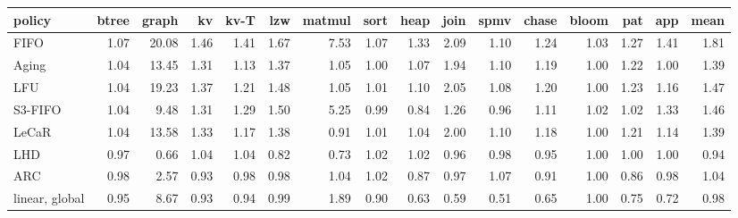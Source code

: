 \begin{tabular}{lrrrrrrrrrrrrrrr}
\toprule
policy & btree & graph & kv & kv-T & lzw & matmul & sort & heap & join & spmv & chase & bloom & pat & app & mean \\
\midrule
FIFO & 1.07 & 20.08 & 1.46 & 1.41 & 1.67 & 7.53 & 1.07 & 1.33 & 2.09 & 1.10 & 1.24 & 1.03 & 1.27 & 1.41 & 1.81 \\
Aging & 1.04 & 13.45 & 1.31 & 1.13 & 1.37 & 1.05 & 1.00 & 1.07 & 1.94 & 1.10 & 1.19 & 1.00 & 1.22 & 1.00 & 1.39 \\
LFU & 1.04 & 19.23 & 1.37 & 1.21 & 1.48 & 1.05 & 1.01 & 1.10 & 2.05 & 1.08 & 1.20 & 1.00 & 1.23 & 1.16 & 1.47 \\
S3-FIFO & 1.04 & 9.48 & 1.31 & 1.29 & 1.50 & 5.25 & 0.99 & 0.84 & 1.26 & 0.96 & 1.11 & 1.02 & 1.02 & 1.33 & 1.46 \\
LeCaR & 1.04 & 13.58 & 1.33 & 1.17 & 1.38 & 0.91 & 1.01 & 1.04 & 2.00 & 1.10 & 1.18 & 1.00 & 1.21 & 1.14 & 1.39 \\
LHD & 0.97 & 0.66 & 1.04 & 1.04 & 0.82 & 0.73 & 1.02 & 1.02 & 0.96 & 0.98 & 0.95 & 1.00 & 1.00 & 1.00 & 0.94 \\
ARC & 0.98 & 2.57 & 0.93 & 0.98 & 0.98 & 1.04 & 1.02 & 0.87 & 0.97 & 1.07 & 0.91 & 1.00 & 0.86 & 0.98 & 1.04 \\
linear, global & 0.95 & 8.67 & 0.93 & 0.94 & 0.99 & 1.89 & 0.90 & 0.63 & 0.59 & 0.51 & 0.65 & 1.00 & 0.75 & 0.72 & 0.98 \\
\bottomrule
\end{tabular}
